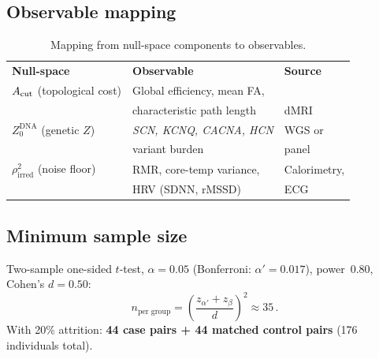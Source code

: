 \documentclass[aps,pre,twocolumn,superscriptaddress,floatfix]{revtex4-2}
\begin{document}
\subsection{Observable mapping}

\begin{table}[h]
\caption{Mapping from null-space components to observables.}
\label{tab:observables}
\begin{ruledtabular}
\begin{tabular}{lll}
  \textbf{Null-space} & \textbf{Observable} & \textbf{Source} \\
  \colrule
  $A_{\text{cut}}$ (topological cost)
    & Global efficiency, mean FA, &
    \\
    & characteristic path length & dMRI \\[4pt]
  $Z_0^{\text{DNA}}$ (genetic $Z$)
    & \textit{SCN, KCNQ, CACNA, HCN}
    & WGS or \\
    & variant burden & panel \\[4pt]
  $\rho_{\text{irred}}^2$ (noise floor)
    & RMR, core-temp variance, & Calorimetry, \\
    & HRV (SDNN, rMSSD) & ECG
\end{tabular}
\end{ruledtabular}
\end{table}

\subsection{Minimum sample size}

Two-sample one-sided $t$-test,
$\alpha=0.05$ (Bonferroni: $\alpha'=0.017$),
power~$0.80$, Cohen's $d=0.50$:
\begin{equation}
  n_{\text{per group}}
  = \left(\frac{z_{\alpha'} + z_\beta}{d}\right)^{\!2}
  \approx 35\,.
  \label{eq:sample-size}
\end{equation}
With 20\% attrition: \textbf{44 case pairs + 44 matched
control pairs} (176 individuals total).
\end{document}
